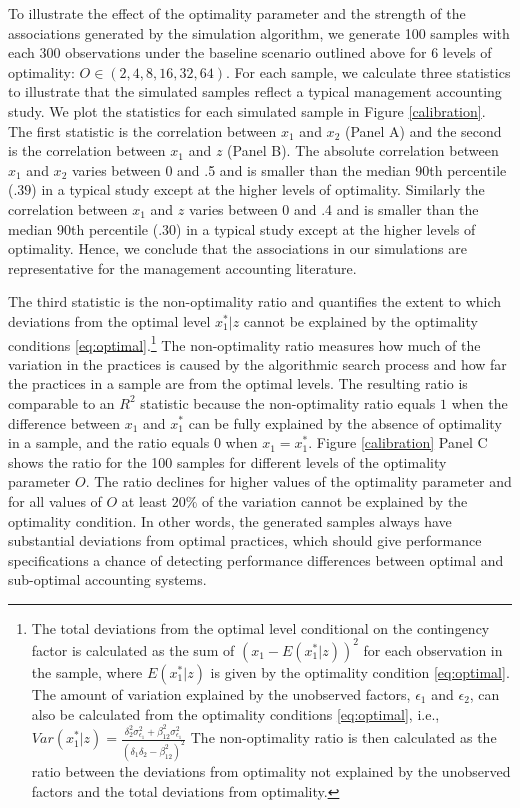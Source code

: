 \documentclass[12pt]{article}
\begin{document}
To illustrate the effect of the optimality parameter and the strength of the associations generated by the simulation algorithm, we generate 100 samples with each 300 observations under the baseline scenario outlined above for 6 levels of optimality: $O \in  (2, 4, 8, 16, 32, 64)$. For each sample, we calculate three statistics to illustrate that the simulated samples reflect a typical management accounting study. We plot the statistics for each simulated sample in Figure \ref{calibration}. The first statistic is the correlation between $x_1$ and $x_2$ (Panel A) and the second is the correlation between $x_1$ and $z$ (Panel B). The absolute correlation between $x_1$ and $x_2$ varies between 0 and .5 and is smaller than the median 90th percentile ($.39$) in a typical study except at the higher levels of optimality. Similarly the correlation between $x_1$ and $z$ varies between 0 and .4 and is smaller than the median 90th percentile (.30) in a typical study except at the higher levels of optimality. Hence, we conclude that the associations in our simulations are representative for the management accounting literature. 

The third statistic is the non-optimality ratio and quantifies the extent to which deviations from the optimal level $x^*_1|z$ cannot be explained by the optimality conditions \eqref{eq:optimal}.\footnote{The total deviations from the optimal level conditional on the contingency factor is calculated as the sum of $(x_1 - E(x_1^*|z))^2$ for each observation in the sample, where $E(x_1^*|z)$ is given by the optimality condition \eqref{eq:optimal}. The amount of variation explained by the unobserved factors, $\epsilon_1$ and $\epsilon_2$, can also be calculated from the optimality conditions \eqref{eq:optimal}, i.e., $Var(x_1^*|z) = \frac{\delta_2^2 \sigma_{\epsilon_1}^2 + \beta_{12}^2 \sigma_{\epsilon_1}^2}{(\delta_1 \delta_2 - \beta_{12}^2)^2}$
The non-optimality ratio is then calculated as the ratio between the deviations from optimality not explained by the unobserved factors and the total deviations from optimality.} The non-optimality ratio measures how much of the variation in the practices is caused by the algorithmic search process and how far the practices in a sample are from the optimal levels. The resulting ratio is comparable to an $R^2$ statistic because the non-optimality ratio equals $1$ when the difference between $x_1$ and $x^*_1$ can be fully explained by the absence of optimality in a sample, and the ratio equals $0$ when $x_1 = x^*_1$. Figure \ref{calibration} Panel C shows the ratio for the 100 samples for different levels of the optimality parameter $O$. The ratio declines for higher values of the optimality parameter and for all values of $O$ at least $20\%$ of the variation cannot be explained by the optimality condition. In other words, the generated samples always have substantial deviations from optimal practices, which should give performance specifications a chance of detecting performance differences between optimal and sub-optimal accounting systems. 
\end{document}
